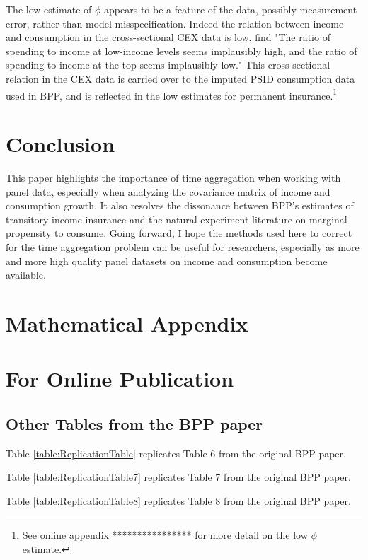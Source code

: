 \documentclass[AER]{AEA}
\begin{document}
The low estimate of $\phi$ appears to be a feature of the data, possibly measurement error, rather than model misspecification. Indeed the relation between income and consumption in the cross-sectional CEX data is low. \cite{NBERc12673} find "The ratio of spending to income at low-income levels seems implausibly high, and the ratio of spending to income at the top seems implausibly low."  This cross-sectional relation in the CEX data is carried over to the imputed PSID consumption data used in BPP, and is reflected in the low estimates for permanent insurance.\footnote{See online appendix **************** for more detail on the low $\phi$ estimate.}

\section{Conclusion}
This paper highlights the importance of time aggregation when working with panel data, especially when analyzing the covariance matrix of income and consumption growth. It also resolves the dissonance between BPP's estimates of transitory income insurance and the natural experiment literature on marginal propensity to consume. Going forward, I hope the methods used here to correct for the time aggregation problem can be useful for researchers, especially as more and more high quality panel datasets on income and consumption become available.





\appendix

\section{Mathematical Appendix}

\newpage
\section{For Online Publication}




\subsection{Other Tables from the BPP paper} \label{table_appendix}

Table \ref{table:ReplicationTable} replicates Table 6 from the original BPP paper.

 

Table \ref{table:ReplicationTable7} replicates Table 7 from the original BPP paper.

 

Table \ref{table:ReplicationTable8} replicates Table 8 from the original BPP paper.
\end{document}
